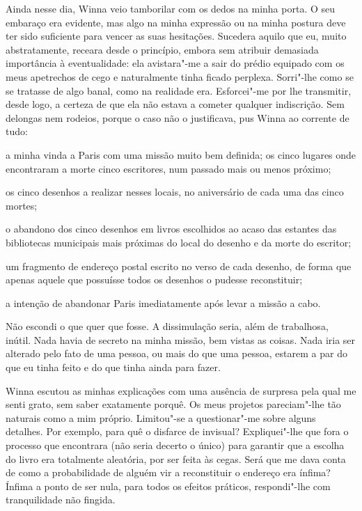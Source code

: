 Ainda nesse dia, Winna veio tamborilar com os dedos na minha porta. O
seu embaraço era evidente, mas algo na minha expressão ou na minha
postura deve ter sido suficiente para vencer as suas hesitações.
Sucedera aquilo que eu, muito abstratamente, receara desde o princípio,
embora sem atribuir demasiada importância à eventualidade: ela avistara"-me
a sair do prédio equipado com os meus apetrechos de cego e
naturalmente tinha ficado perplexa. Sorri"-lhe como se se tratasse de
algo banal, como na realidade era. Esforcei"-me por lhe transmitir, desde
logo, a certeza de que ela não estava a cometer qualquer indiscrição.
Sem delongas nem rodeios, porque o caso não o justificava, pus Winna ao
corrente de tudo:

a minha vinda a Paris com uma missão muito bem definida; os cinco
lugares onde encontraram a morte cinco escritores, num passado mais ou menos próximo;

os cinco desenhos a realizar nesses locais, no aniversário de cada uma
das cinco mortes;

o abandono dos cinco desenhos em livros escolhidos ao acaso das estantes
das bibliotecas municipais mais próximas do local do desenho e da morte
do escritor;

um fragmento de endereço postal escrito no verso de cada desenho, de
forma que apenas aquele que possuísse todos os desenhos o pudesse
reconstituir;

a intenção de abandonar Paris imediatamente após levar a missão a cabo.

Não escondi o que quer que fosse. A dissimulação seria, além de
trabalhosa, inútil. Nada havia de secreto na minha missão, bem vistas as
coisas. Nada iria ser alterado pelo fato de uma pessoa, ou mais do que
uma pessoa, estarem a par do
que eu tinha feito e do que tinha ainda para fazer.

Winna escutou as minhas explicações com uma ausência de surpresa pela
qual me senti grato, sem saber exatamente porquê. Os meus projetos
pareciam"-lhe tão naturais como a mim próprio. Limitou"-se a questionar"-me
sobre alguns detalhes. Por exemplo, para quê o disfarce de invisual?
Expliquei"-lhe que fora o processo que encontrara (não seria decerto o único) para
garantir que a escolha do livro era totalmente aleatória, por ser feita
às cegas. Será que me dava conta de como a probabilidade de alguém vir a
reconstituir o endereço era ínfima? Ínfima a ponto de ser nula, para
todos os efeitos práticos, respondi"-lhe com tranquilidade não fingida.

